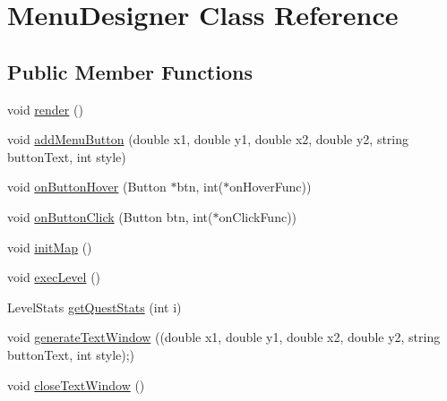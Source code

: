 \hypertarget{classMenuDesigner}{\section{Menu\-Designer Class Reference}
\label{classMenuDesigner}
}
\subsection*{Public Member Functions}
\begin{DoxyCompactItemize}
\item 
void \hyperlink{classMenuDesigner_a63784951606d0ec88120c9c47e83462f}{render} ()
\item 
void \hyperlink{classMenuDesigner_a359ccfa2b2484c0e413383c5a41ffb7d}{add\-Menu\-Button} (double x1, double y1, double x2, double y2, string button\-Text, int style)
\item 
void \hyperlink{classMenuDesigner_ad6a4d772a6462ceada64550f1c02558b}{on\-Button\-Hover} (Button $\ast$btn, int($\ast$on\-Hover\-Func))
\item 
void \hyperlink{classMenuDesigner_a73a5d6f98ed1148d58b3a4185683668f}{on\-Button\-Click} (Button btn, int($\ast$on\-Click\-Func))
\item 
void \hyperlink{classMenuDesigner_a55338cb6b43967e2d17714daa5dff4d8}{init\-Map} ()
\item 
void \hyperlink{classMenuDesigner_a061b72db0f19efa0f59b9b9f8d9c28d8}{exec\-Level} ()
\item 
Level\-Stats \hyperlink{classMenuDesigner_ae7d90855892b5315f15c60ff26dbb262}{get\-Quest\-Stats} (int i)
\item 
void \hyperlink{classMenuDesigner_abfc968d082802dad003fc94a075e034c}{generate\-Text\-Window} ((double x1, double y1, double x2, double y2, string button\-Text, int style);)
\item 
void \hyperlink{classMenuDesigner_ac92c5eea18112122bdde8897d4576d0b}{close\-Text\-Window} ()
\end{DoxyCompactItemize}
